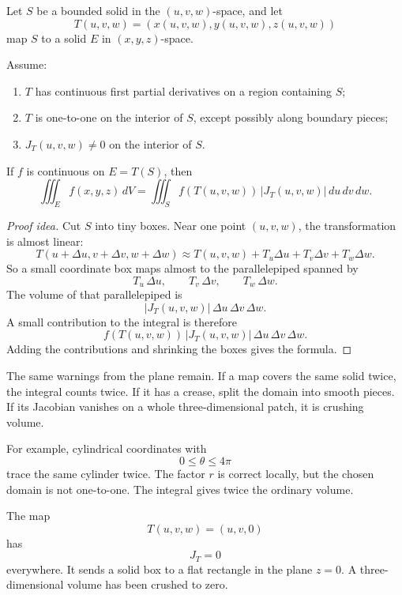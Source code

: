 \begin{theorem}
Let \(S\) be a bounded solid in the \((u,v,w)\)-space, and let
\[
    T(u,v,w)=(x(u,v,w),y(u,v,w),z(u,v,w))
\]
map \(S\) to a solid \(E\) in \((x,y,z)\)-space.

Assume:

\begin{enumerate}
\item \(T\) has continuous first partial derivatives on a region containing \(S\);

\item \(T\) is one-to-one on the interior of \(S\), except possibly along boundary
pieces;

\item \(J_T(u,v,w)\ne0\) on the interior of \(S\).
\end{enumerate}

If \(f\) is continuous on \(E=T(S)\), then
\[
\boxed{
    \iiint_E f(x,y,z)\,dV
    =
    \iiint_S
    f(T(u,v,w))\,|J_T(u,v,w)|\,du\,dv\,dw.
}
\]
\end{theorem}

\begin{proof}[Proof idea]
Cut \(S\) into tiny boxes.  Near one point \((u,v,w)\), the transformation is almost
linear:
\[
    T(u+\Delta u,v+\Delta v,w+\Delta w)
    \approx
    T(u,v,w)+T_u\Delta u+T_v\Delta v+T_w\Delta w.
\]
So a small coordinate box maps almost to the parallelepiped spanned by
\[
    T_u\,\Delta u,
    \qquad
    T_v\,\Delta v,
    \qquad
    T_w\,\Delta w.
\]
The volume of that parallelepiped is
\[
    |J_T(u,v,w)|\,\Delta u\,\Delta v\,\Delta w.
\]
A small contribution to the integral is therefore
\[
    f(T(u,v,w))\,|J_T(u,v,w)|\,\Delta u\,\Delta v\,\Delta w.
\]
Adding the contributions and shrinking the boxes gives the formula.
\end{proof}

The same warnings from the plane remain.  If a map covers the same solid twice, the
integral counts twice.  If it has a crease, split the domain into smooth pieces.  If its
Jacobian vanishes on a whole three-dimensional patch, it is crushing volume.

For example, cylindrical coordinates with
\[
    0\le\theta\le4\pi
\]
trace the same cylinder twice.  The factor \(r\) is correct locally, but the chosen
domain is not one-to-one.  The integral gives twice the ordinary volume.

The map
\[
    T(u,v,w)=(u,v,0)
\]
has
\[
    J_T=0
\]
everywhere.  It sends a solid box to a flat rectangle in the plane \(z=0\).  A
three-dimensional volume has been crushed to zero.

